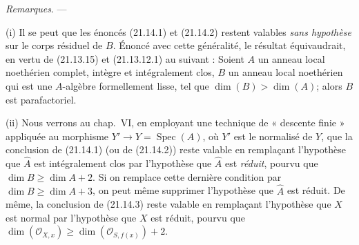 \begin{env}[21.14.4]
\label{IV.21.14.4}
\emph{Remarques}. ---

(i) Il se peut que les énoncés (21.14.1) et (21.14.2) restent valables \emph{sans
hypothèse} sur le corps résiduel de $B$. Énoncé avec cette généralité, le résultat
équivaudrait, en vertu de (21.13.15) et (21.13.12.1) au suivant : Soient $A$ un
anneau local noethérien complet, intègre et intégralement clos, $B$ un anneau local
noethérien qui est une $A$-algèbre formellement lisse, tel que
$\dim(B)>\dim(A)$; alors $B$ est parafactoriel.

(ii) Nous verrons au chap.~VI, en employant une technique de « descente finie »
appliquée au morphisme $Y'\to Y=\operatorname{Spec}(A)$, où $Y'$ est le normalisé de
$Y$, que la conclusion de (21.14.1) (ou de (21.14.2)) reste valable en remplaçant
l'hypothèse que $\widehat A$ est intégralement clos par l'hypothèse que
$\widehat A$ est \emph{réduit}, pourvu que $\dim B\geq\dim A+2$. Si on remplace cette
dernière condition par $\dim B\geq\dim A+3$, on peut même supprimer l'hypothèse que
$\widehat A$ est réduit. De même, la conclusion de (21.14.3) reste valable en
remplaçant l'hypothèse que $X$ est normal par l'hypothèse que $X$ est réduit, pourvu
que $\dim(\mathcal O_{X,x})\geq\dim(\mathcal O_{S,f(x)})+2$.


\end{env}
